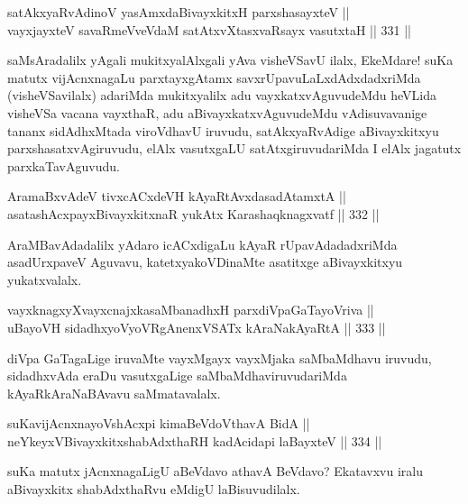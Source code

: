 \begin{shl}
satAkxyaRvAdinoV yasAmxdaBivayxkitxH parxshasayxteV ||  \\
vayxjayxteV savaRmeVveVdaM satAtxvXtasxvaRsayx vasutxtaH \hfill || 331 ||  
\end{shl}

\begin{artha}
saMsAradalilx yAgali mukitxyalAlxgali yAva visheVSavU ilalx, EkeMdare!
suKa matutx vijAcnxnagaLu parxtayxgAtamx savxrUpavuLaLxdAdxdadxriMda
(visheVSavilalx) adariMda mukitxyalilx adu vayxkatxvAguvudeMdu heVLida
visheVSa vacana vayxthaR, adu aBivayxkatxvAguvudeMdu vAdisuvavanige
tananx sidAdhxMtada viroVdhavU iruvudu, satAkxyaRvAdige aBivayxkitxyu
parxshasatxvAgiruvudu, elAlx vasutxgaLU satAtxgiruvudariMda I elAlx
jagatutx parxkaTavAguvudu.
\end{artha}

\begin{shl}
AramaBxvAdeV tivxcACxdeVH kAyaRtAvxdasadAtamxtA || \\
asatashAcxpayxBivayxkitxnaR yukAtx Karashaqknagxvatf \hfill || 332 ||  
\end{shl}

\begin{artha}
AraMBavAdadalilx yAdaro icACxdigaLu kAyaR rUpavAdadadxriMda
asadUrxpaveV Aguvavu, katetxyakoVDinaMte asatitxge aBivayxkitxyu
yukatxvalalx.
\end{artha}

\begin{shl}
vayxknagxyXvayxcnajxkasaMbanadhxH parxdiVpaGaTayoVriva || \\
uBayoVH sidadhxyoVyoVRgAnenxVSATx kAraNakAyaRtA \hfill || 333 ||  
\end{shl}

\begin{artha}
diVpa GaTagaLige iruvaMte vayxMgayx vayxMjaka saMbaMdhavu iruvudu,
sidadhxvAda eraDu vasutxgaLige saMbaMdhaviruvudariMda
kAyaRkAraNaBAvavu saMmatavalalx.
\end{artha}

\begin{shl}
suKavijAcnxnayoVshAcxpi kimaBeVdoV\s thavA BidA || \\
neYkeyxV\s BivayxkitxshabAdxthaRH kadAcidapi laBayxteV \hfill || 334 ||  
\end{shl}

\begin{artha}
suKa matutx jAcnxnagaLigU aBeVdavo athavA BeVdavo? Ekatavxvu iralu
aBivayxkitx shabAdxthaRvu eMdigU laBisuvudilalx.
\end{artha}


